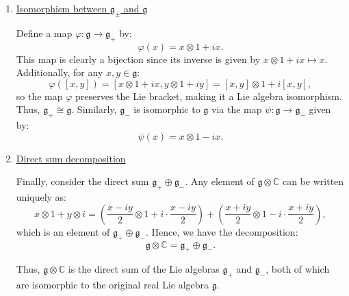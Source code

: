 \documentclass[10pt]{article}
\begin{document}
\begin{enumerate}
	\item \underline{Isomorphism between \(\mathfrak{g}_\pm\) and \(\mathfrak{g}\)}
	
	Define a map \(\varphi: \mathfrak{g} \to \mathfrak{g}_+\) by:
	$$
	\varphi(x) = x \otimes 1 + i x.
	$$
	This map is clearly a bijection since its inverse is given by \(x \otimes 1 + i x \mapsto x\). Additionally, for any \(x, y \in \mathfrak{g}\):
	$$
	\varphi([x, y]) = [x \otimes 1 + i x, y \otimes 1 + i y] = [x, y] \otimes 1 + i [x, y],
	$$
	so the map \(\varphi\) preserves the Lie bracket, making it a Lie algebra isomorphism. Thus, \(\mathfrak{g}_+ \cong \mathfrak{g}\). Similarly, \(\mathfrak{g}_-\) is isomorphic to \(\mathfrak{g}\) via the map \(\psi: \mathfrak{g} \to \mathfrak{g}_-\) given by:
	$$
	\psi(x) = x \otimes 1 - i x.
	$$
	
	\item \underline{Direct sum decomposition}
	
	Finally, consider the direct sum \(\mathfrak{g}_+ \oplus \mathfrak{g}_-\). Any element of \(\mathfrak{g} \otimes \mathbb{C}\) can be written uniquely as:
	$$
	x \otimes 1 + y \otimes i = \left(\frac{x - iy}{2} \otimes 1 + i \cdot \frac{x - iy}{2}\right) + \left(\frac{x + iy}{2} \otimes 1 - i \cdot \frac{x + iy}{2}\right),
	$$
	which is an element of \(\mathfrak{g}_+ \oplus \mathfrak{g}_-\). Hence, we have the decomposition:
	$$
	\mathfrak{g} \otimes \mathbb{C} = \mathfrak{g}_+ \oplus \mathfrak{g}_-.
	$$
	
	Thus, \(\mathfrak{g} \otimes \mathbb{C}\) is the direct sum of the Lie algebras \(\mathfrak{g}_+\) and \(\mathfrak{g}_-\), both of which are isomorphic to the original real Lie algebra \(\mathfrak{g}\).
\end{enumerate}
	
\end{document}
